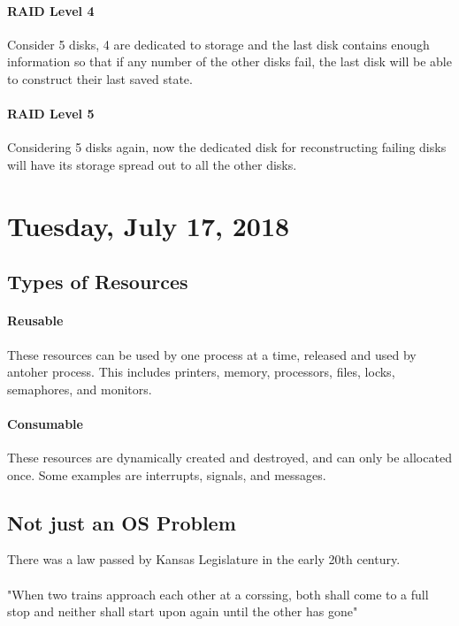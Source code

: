 \documentclass{article}
\begin{document}
\paragraph{RAID Level 4} Consider 5 disks, 4 are dedicated to storage and the last disk contains enough information so that if any number of the other disks fail, the last disk will be able to construct their last saved state.

\paragraph{RAID Level 5} Considering 5 disks again, now the dedicated disk for reconstructing failing disks will have its storage spread out to all the other disks.

\newpage

\section{Tuesday, July 17, 2018}

\subsection{Types of Resources}

\paragraph{Reusable} These resources can be used by one process at a time, released and used by antoher process. This includes printers, memory, processors, files, locks, semaphores, and monitors.

\paragraph{Consumable} These resources are dynamically created and destroyed, and can only be allocated once. Some examples are interrupts, signals, and messages.


\subsection{Not just an OS Problem}

There was a law passed by Kansas Legislature in the early 20th century.\\
\\
"When two trains approach each other at a corssing, both shall come to a full stop and neither shall start upon again until the other has gone"
\end{document}
